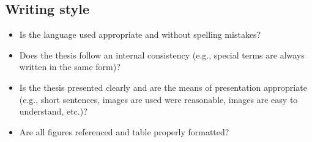 \subsection{Writing style}

\begin{itemize}
    \item Is the language used appropriate and without spelling mistakes?
    \item Does the thesis follow an internal consistency (e.g., special terms are always written in the same form)?
    \item Is the thesis presented clearly and are the means of presentation appropriate (e.g., short sentences, images are used were reasonable, images are easy to understand, etc.)?
    \item Are all figures referenced and table properly formatted?
\end{itemize}



